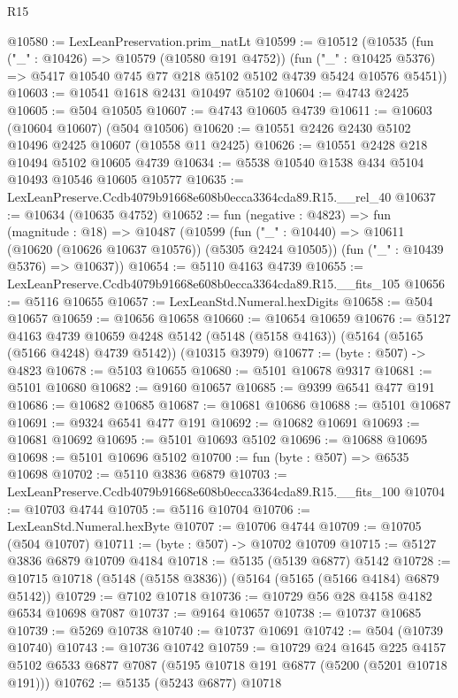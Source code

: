 \begin{lexlean}{R15}
\begin{coremodule}
{{{{{{{{{{{@10580 := LexLeanPreservation.prim_natLt
@10599 := @10512
    (@10535
      (fun ("_" : @10426) => @10579 (@10580 @191 @4752))
      (fun ("_" : @10425 @5376) => @5417 @10540 @745 @77 @218 @5102 @5102 @4739 @5424 @10576 @5451))
@10603 := @10541 @1618 @2431 @10497 @5102
@10604 := @4743 @2425
@10605 := @504 @10505
@10607 := @4743 @10605 @4739
@10611 := @10603 (@10604 @10607) (@504 @10506)
@10620 := @10551 @2426 @2430 @5102 @10496 @2425 @10607 (@10558 @11 @2425)
@10626 := @10551 @2428 @218 @10494 @5102 @10605 @4739
@10634 := @5538 @10540 @1538 @434 @5104 @10493 @10546 @10605 @10577
@10635 := LexLeanPreserve.Ccdb4079b91668e608b0ecca3364cda89.R15.__rel_40
@10637 := @10634 (@10635 @4752)
@10652 := fun (negative : @4823) =>
  fun (magnitude : @18) =>
  @10487
    (@10599
      (fun ("_" : @10440) => @10611 (@10620 (@10626 @10637 @10576)) (@5305 @2424 @10505))
      (fun ("_" : @10439 @5376) => @10637))
@10654 := @5110 @4163 @4739
@10655 := LexLeanPreserve.Ccdb4079b91668e608b0ecca3364cda89.R15.__fits_105
@10656 := @5116 @10655
@10657 := LexLeanStd.Numeral.hexDigits
@10658 := @504 @10657
@10659 := @10656 @10658
@10660 := @10654 @10659
@10676 := @5127
    @4163
    @4739
    @10659
    @4248
    @5142
    (@5148 (@5158 @4163))
    (@5164 (@5165 (@5166 @4248) @4739 @5142))
    (@10315 @3979)
@10677 := (byte : @507) -> @4823
@10678 := @5103 @10655
@10680 := @5101 @10678 @9317
@10681 := @5101 @10680
@10682 := @9160 @10657
@10685 := @9399 @6541 @477 @191
@10686 := @10682 @10685
@10687 := @10681 @10686
@10688 := @5101 @10687
@10691 := @9324 @6541 @477 @191
@10692 := @10682 @10691
@10693 := @10681 @10692
@10695 := @5101 @10693 @5102
@10696 := @10688 @10695
@10698 := @5101 @10696 @5102
@10700 := fun (byte : @507) => @6535 @10698
@10702 := @5110 @3836 @6879
@10703 := LexLeanPreserve.Ccdb4079b91668e608b0ecca3364cda89.R15.__fits_100
@10704 := @10703 @4744
@10705 := @5116 @10704
@10706 := LexLeanStd.Numeral.hexByte
@10707 := @10706 @4744
@10709 := @10705 (@504 @10707)
@10711 := (byte : @507) -> @10702 @10709
@10715 := @5127 @3836 @6879 @10709 @4184
@10718 := @5135 (@5139 @6877) @5142
@10728 := @10715 @10718 (@5148 (@5158 @3836)) (@5164 (@5165 (@5166 @4184) @6879 @5142))
@10729 := @7102 @10718
@10736 := @10729 @56 @28 @4158 @4182 @6534 @10698 @7087
@10737 := @9164 @10657
@10738 := @10737 @10685
@10739 := @5269 @10738
@10740 := @10737 @10691
@10742 := @504 (@10739 @10740)
@10743 := @10736 @10742
@10759 := @10729
    @24
    @1645
    @225
    @4157
    @5102
    @6533
    @6877
    @7087
    (@5195 @10718 @191 @6877 (@5200 (@5201 @10718 @191)))
@10762 := @5135 (@5243 @6877) @10718
}}}}}}}}}}}
\end{coremodule}
\end{lexlean}
